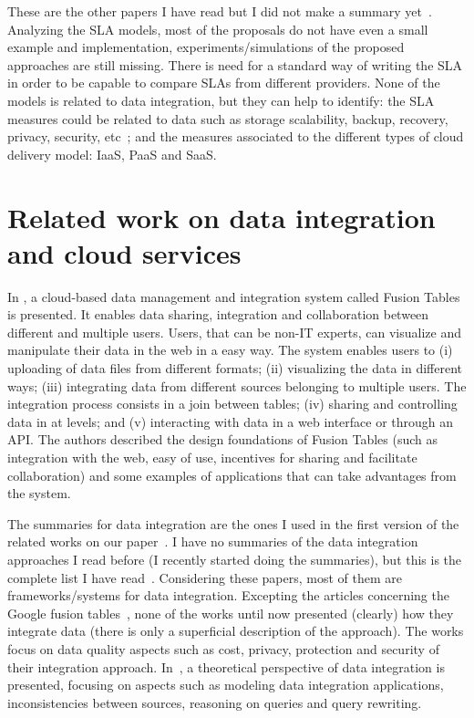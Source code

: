 \documentclass[12pt,a4paper,oneside]{article}
\begin{document}
\bigskip These are the other papers I have read but I did not make a summary yet~\cite{BernsmedJU11,025}.
Analyzing the SLA models, most of the proposals do not have even a small example and implementation, experiments/simulations of the proposed approaches are still missing. There is need for a standard way of writing the SLA in order to be capable to compare SLAs from different providers. None of the models is related to data integration, but they can help to identify: the SLA measures could be related to data such as storage scalability, backup, recovery, privacy, security, etc~\cite{005}; and the measures associated to the different types of cloud delivery model: IaaS, PaaS and SaaS.




\section{Related work on data integration and cloud services}

In \cite{Gonzalez:2010b}, a cloud-based data management and integration system called Fusion Tables is presented. It enables data sharing, integration and collaboration between different and multiple users. Users, that can be non-IT experts, can visualize and manipulate their data in the web in a easy way. The system enables users to (i) uploading of data files from different formats; (ii) visualizing the data in different ways; (iii) integrating data from different sources belonging to multiple users. The integration process consists in a join between tables; (iv) sharing and controlling data in at levels; and (v) interacting with data in a web interface or through an API. The authors described the design foundations of Fusion Tables (such as integration with the web, easy of use, incentives for sharing and facilitate collaboration) and some examples of applications that can take advantages from the system. 

The summaries for data integration are the ones I used in the first version of the related works on our paper~\cite{075,078,Nie07,096,Yau08}. I have no summaries of the data integration approaches I read before (I recently started doing the summaries), but this is the complete list I have read~\cite{066,067,070,072,113,077,Dustdar:2012,081,110,111,094,099,102}. Considering these papers, most of them are frameworks/systems for data integration. Excepting the articles concerning the Google fusion tables~\cite{Gonzalez:2010}, none of the works until now presented (clearly) how they integrate data (there is only a superficial description of the approach). The works focus on data quality aspects such as cost, privacy, protection and security of their integration approach. In~\cite{Lenzerini:2002}, a theoretical perspective of data integration is presented, focusing on aspects such as modeling data integration applications, inconsistencies between sources, reasoning on queries and query rewriting.



\end{document}
